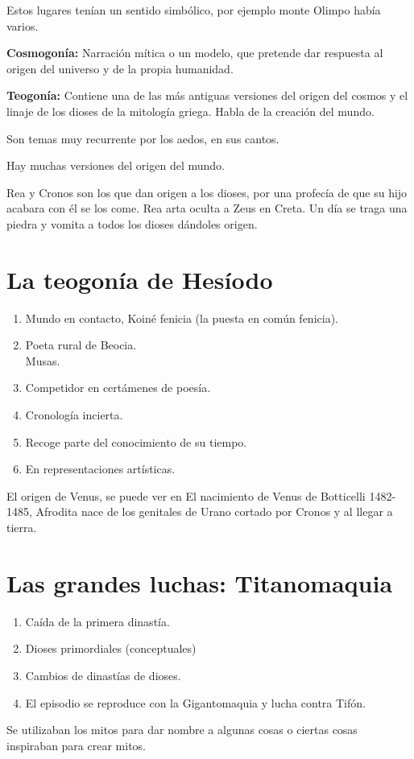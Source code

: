 Estos lugares tenían un sentido simbólico, por ejemplo monte Olimpo había varios.

\textbf{Cosmogonía:} Narración mítica o un modelo, que pretende dar respuesta al origen del universo y de la propia humanidad.

\textbf{Teogonía:} Contiene una de las más antiguas versiones del origen del cosmos y el linaje de los dioses de la mitología griega. Habla de la creación del mundo.

Son temas muy recurrente por los aedos, en sus cantos.

Hay muchas versiones del origen del mundo.

Rea y Cronos son los que dan origen a los dioses, por una profecía de que su hijo acabara con él se los come. Rea arta oculta a Zeus en Creta. Un día se traga una piedra y vomita a todos los dioses dándoles origen.

\section{La teogonía de Hesíodo}
\begin{enumerate}
  \item Mundo en contacto, Koiné fenicia (la puesta en común fenicia).
  \item Poeta rural de Beocia. \\ Musas.
  \item Competidor en certámenes de poesía.
  \item Cronología incierta.
  \item Recoge parte del conocimiento de su tiempo.
  \item En representaciones artísticas.
\end{enumerate}

El origen de Venus, se puede ver en El nacimiento de Venus de Botticelli 1482-1485, Afrodita nace de los genitales de Urano cortado por Cronos y al llegar a tierra.

\section{Las grandes luchas: Titanomaquia}
\begin{enumerate}
  \item Caída de la primera dinastía.
  \item Dioses primordiales (conceptuales)
  \item Cambios de dinastías de dioses.
  \item El episodio se reproduce con la Gigantomaquia y lucha contra Tifón.
\end{enumerate}

Se utilizaban los mitos para dar nombre a algunas cosas o ciertas cosas inspiraban para crear mitos.
